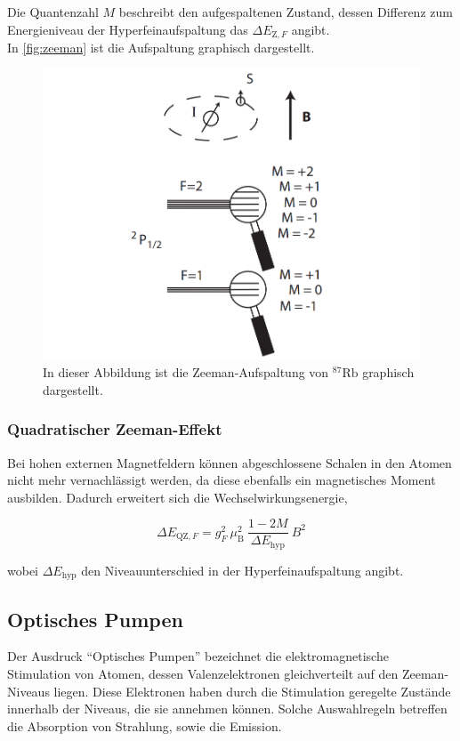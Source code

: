 Die Quantenzahl $M$ beschreibt den aufgespaltenen Zustand, dessen Differenz zum Energieniveau der Hyperfeinaufspaltung das $\Delta E_{\text{Z},F}$ angibt.\\
In \autoref{fig:zeeman} ist die Aufspaltung graphisch dargestellt.

\begin{figure}[H]
    \centering
    \includegraphics[scale=0.4]{figures/zeeman.png}
    \caption{In dieser Abbildung ist die Zeeman-Aufspaltung von $^{87}\text{Rb}$ graphisch dargestellt.\cite{pdf_anleitung}}
    \label{fig:zeeman}
\end{figure}

\subsubsection{Quadratischer Zeeman-Effekt}
Bei hohen externen Magnetfeldern können abgeschlossene Schalen in den Atomen nicht mehr vernachlässigt werden, da diese ebenfalls ein magnetisches Moment ausbilden.
Dadurch erweitert sich die Wechselwirkungsenergie,

\begin{equation}
    \Delta E_{\text{QZ},F} = g_F^2\ \mu_{\text{B}}^2\ \frac{1-2M}{\Delta E_{\text{hyp}}}\ B^2
    \label{eq:quadzeeman}
\end{equation}

wobei $\Delta E_{\text{hyp}}$ den Niveauunterschied in der Hyperfeinaufspaltung angibt.

\subsection{Optisches Pumpen}
Der Ausdruck \enquote{Optisches Pumpen} bezeichnet die elektromagnetische Stimulation von Atomen, dessen Valenzelektronen gleichverteilt auf den Zeeman-Niveaus liegen.
Diese Elektronen haben durch die Stimulation geregelte Zustände innerhalb der Niveaus, die sie annehmen können.
Solche Auswahlregeln betreffen die Absorption von Strahlung, sowie die Emission.
